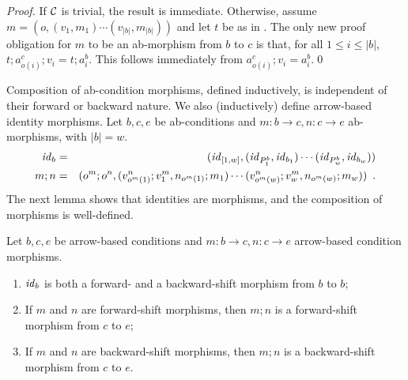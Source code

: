 \begin{fullorname}
\begin{proof}
If $\mathcal{C}$ is trivial, the result is immediate. Otherwise, assume $m = (o,(v_1,m_1)\cdots(v_{|b|},m_{|b|}))$ and let $t$ be as in . The only new proof obligation for $m$ to be an ab-morphism from $b$ to $c$ is that, for all $1\leq i\leq |b|$, $t;a^c_{o(i)};v_i=t;a^b_i$. This follows immediately from $a^c_{o(i)};v_i=a^b_i$.\qed
\end{proof}
\end{fullorname}
%
Composition of ab-condition morphisms, defined inductively, is independent of their forward or backward nature. We also (inductively) define arrow-based identity morphisms. Let $b,c,e$ be ab-conditions and $m:b\to c,n:c\to e$ ab-morphisms, with $|b|=w$.
%
\begin{eqnarray}
\id_b & =
  & (\id_{[1,w]},(\id_{P^b_1},\id_{b_1})\cdots 
                 (\id_{P^b_w},\id_{b_w}))
  \eqlabel{id-morphism} \\
m;n & =
  & (o^m;o^n,(v^n_{o^m(1)};v^m_1,n_{o^m(1)};m_1)\cdots 
              (v^n_{o^m(w)};v^m_w,n_{o^m(w)};m_w)) \enspace.
 \eqlabel{morphism composition}
\end{eqnarray}
%
The next lemma shows that identities are morphisms, and the composition of morphisms is well-defined.

\begin{lemma}
Let $b,c,e$ be arrow-based conditions and $m:b\to c,n:c\to e$ arrow-based condition morphisms.
\begin{enumerate}[topsep=\smallskipamount]
\item $\mathit{id}_b$ is both a forward- and a backward-shift morphism from $b$ to $b$;
\item If $m$ and $n$ are forward-shift morphisms, then $m;n$ is a forward-shift morphism from $c$ to $e$;
\item If $m$ and $n$ are backward-shift morphisms, then $m;n$ is a backward-shift morphism from $c$ to $e$.
\end{enumerate}
\end{lemma}

